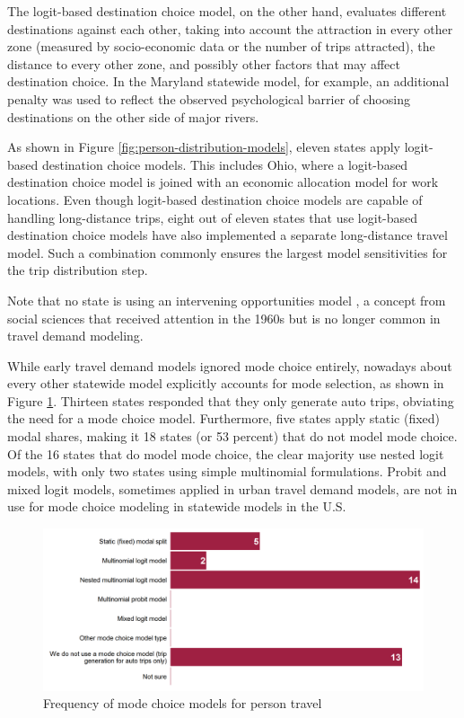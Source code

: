 The logit-based destination choice model, on the other hand, evaluates different destinations against each other, taking into account the attraction in every other zone (measured by socio-economic data or the number of trips attracted), the distance to every other zone, and possibly other factors that may affect destination choice. In the Maryland statewide model, for example, an additional penalty was used to reflect the observed psychological barrier of choosing destinations on the other side of major rivers. 

As shown in Figure \ref{fig:person-distribution-models}, eleven states apply logit-based destination choice models. This includes Ohio, where a logit-based destination choice model is joined with an economic allocation model for work locations. Even though logit-based destination choice models are capable of handling long-distance trips, eight out of eleven states that use logit-based destination choice models have also implemented a separate long-distance travel model. Such a combination commonly ensures the largest model sensitivities for the trip distribution step.

Note that no state is using an intervening opportunities model \citep{stouffer40}, a concept from social sciences that received attention in the 1960s but is no longer common in travel demand modeling.

While early travel demand models ignored mode choice entirely, nowadays about every other statewide model explicitly accounts for mode selection, as shown in Figure \ref{fig:person-mode-choice}. Thirteen states responded that they only generate auto trips, obviating the need for a mode choice model. Furthermore, five states apply static (fixed) modal shares, making it 18 states (or 53 percent) that do not model mode choice. Of the 16 states that do model mode choice, the clear majority use nested logit models, with only two states using simple multinomial formulations. Probit and mixed logit models, sometimes applied in urban travel demand models, are not in use for mode choice modeling in statewide models in the U.S.

\begin{figure}
\centering
\includegraphics[width=6.4in]{graphics/09-person-mode-choice}
\caption{Frequency of mode choice models for person travel}
\label{fig:person-mode-choice}
\end{figure}


